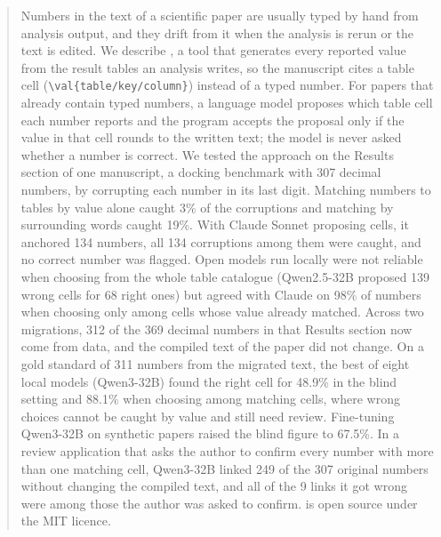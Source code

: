 \begin{abstract}
Numbers in the text of a scientific paper are usually typed by hand from analysis output, and
they drift from it when the analysis is rerun or the text is edited. We describe \pv{}, a tool
that generates every reported value from the result tables an analysis writes, so the manuscript
cites a table cell (\texttt{\textbackslash val\{table/key/column\}}) instead of a typed number.
For papers that already contain typed numbers, a language model proposes which table cell each
number reports and the program accepts the proposal only if the value in that cell rounds to the
written text; the model is never asked whether a number is correct. We tested the approach on
the Results section of one manuscript, a docking benchmark with 307 decimal numbers, by
corrupting each number in its last digit. Matching numbers to tables by value alone caught 3\% of
the corruptions and matching by surrounding words caught 19\%. With Claude Sonnet proposing
cells, it anchored 134 numbers, all 134 corruptions among them were caught, and no correct
number was flagged. Open models
run locally were not reliable when choosing from the whole table catalogue (Qwen2.5-32B proposed
139 wrong cells for 68 right ones) but agreed with Claude on 98\% of numbers when choosing only
among cells whose value already matched. Across two migrations, 312 of the 369 decimal numbers in
that Results section now come from data, and the compiled text of the paper did not change.
On a gold standard of 311 numbers from the migrated text, the best of eight local models
(Qwen3-32B) found the right cell for 48.9\% in the blind setting and 88.1\% when choosing among
matching cells, where wrong choices cannot be caught by value and still need review.
Fine-tuning Qwen3-32B on synthetic papers raised the blind figure to 67.5\%. In a
review application that asks the author to confirm every number with more than one matching
cell, Qwen3-32B linked 249 of the 307 original numbers without changing the compiled text, and
all of the 9 links it got wrong were among those the author was asked to confirm. \pv{} is open
source under the MIT licence.
\end{abstract}
